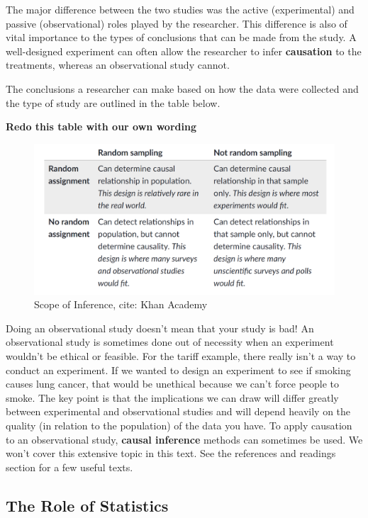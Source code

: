 \documentclass[
]{book}
\theoremstyle{definition}
\theoremstyle{definition}
\theoremstyle{definition}
\theoremstyle{remark}
\begin{document}
The major difference between the two studies was the active (experimental) and passive (observational) roles played by the researcher. This difference is also of vital importance to the types of conclusions that can be made from the study. A well-designed experiment can often allow the researcher to infer \textbf{causation} to the treatments, whereas an observational study cannot.

The conclusions a researcher can make based on how the data were collected and the type of study are outlined in the table below.

\textbf{Redo this table with our own wording}

\begin{figure}

{\centering \includegraphics[width=0.8\linewidth]{img/ScopeOfInferenceTable} 

}

\caption{Scope of Inference, cite: Khan Academy}\label{fig:scope}
\end{figure}

Doing an observational study doesn't mean that your study is bad! An observational study is sometimes done out of necessity when an experiment wouldn't be ethical or feasible. For the tariff example, there really isn't a way to conduct an experiment. If we wanted to design an experiment to see if smoking causes lung cancer, that would be unethical because we can't force people to smoke. The key point is that the implications we can draw will differ greatly between experimental and observational studies and will depend heavily on the quality (in relation to the population) of the data you have. To apply causation to an observational study, \textbf{causal inference} methods can sometimes be used. We won't cover this extensive topic in this text. See the references and readings section for a few useful texts.

\hypertarget{the-role-of-statistics}{%
\subsection{The Role of Statistics}\label{the-role-of-statistics}}
\end{document}
